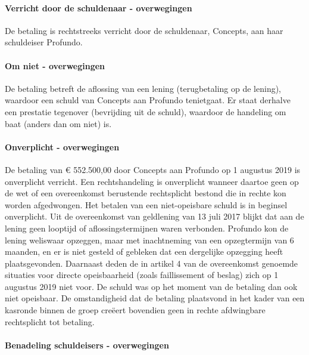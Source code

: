 \documentclass[
  dutch,
  a4paper,
]{article}
\begin{document}
\paragraph{Verricht door de schuldenaar - overwegingen}\label{verricht-door-de-schuldenaar---overwegingen-44}

De betaling is rechtstreeks verricht door de schuldenaar, Concepts, aan haar schuldeiser Profundo.

\paragraph{Om niet - overwegingen}\label{om-niet---overwegingen-44}

De betaling betreft de aflossing van een lening (terugbetaling op de lening), waardoor een schuld van Concepts aan Profundo tenietgaat. Er staat derhalve een prestatie tegenover (bevrijding uit de schuld), waardoor de handeling om baat (anders dan om niet) is.

\paragraph{Onverplicht - overwegingen}\label{onverplicht---overwegingen-44}

De betaling van € 552.500,00 door Concepts aan Profundo op 1 augustus 2019 is onverplicht verricht. Een rechtshandeling is onverplicht wanneer daartoe geen op de wet of een overeenkomst berustende rechtsplicht bestond die in rechte kon worden afgedwongen. Het betalen van een niet-opeisbare schuld is in beginsel onverplicht. Uit de overeenkomst van geldlening van 13 juli 2017 blijkt dat aan de lening geen looptijd of aflossingstermijnen waren verbonden. Profundo kon de lening weliswaar opzeggen, maar met inachtneming van een opzegtermijn van 6 maanden, en er is niet gesteld of gebleken dat een dergelijke opzegging heeft plaatsgevonden. Daarnaast deden de in artikel 4 van de overeenkomst genoemde situaties voor directe opeisbaarheid (zoals faillissement of beslag) zich op 1 augustus 2019 niet voor. De schuld was op het moment van de betaling dan ook niet opeisbaar. De omstandigheid dat de betaling plaatsvond in het kader van een kasronde binnen de groep creëert bovendien geen in rechte afdwingbare rechtsplicht tot betaling.

\paragraph{Benadeling schuldeisers - overwegingen}\label{benadeling-schuldeisers---overwegingen-44}
\end{document}
